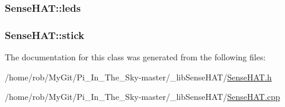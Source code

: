 \subsubsection[{\texorpdfstring{leds}{leds}}]{ Sense\+H\+A\+T\+::leds}\hypertarget{class_sense_h_a_t_a09557e42b20ddddc1763917bd36f36a7}{}\label{class_sense_h_a_t_a09557e42b20ddddc1763917bd36f36a7}
\subsubsection[{\texorpdfstring{stick}{stick}}]{ Sense\+H\+A\+T\+::stick}\hypertarget{class_sense_h_a_t_a69d5712bf0663364109f9a482178dc2c}{}\label{class_sense_h_a_t_a69d5712bf0663364109f9a482178dc2c}


The documentation for this class was generated from the following files\+:\begin{DoxyCompactItemize}
\item 
/home/rob/\+My\+Git/\+Pi\+\_\+\+In\+\_\+\+The\+\_\+\+Sky-\/master/\+\_\+lib\+Sense\+H\+A\+T/\hyperlink{_sense_h_a_t_8h}{Sense\+H\+A\+T.\+h}\item 
/home/rob/\+My\+Git/\+Pi\+\_\+\+In\+\_\+\+The\+\_\+\+Sky-\/master/\+\_\+lib\+Sense\+H\+A\+T/\hyperlink{_sense_h_a_t_8cpp}{Sense\+H\+A\+T.\+cpp}\end{DoxyCompactItemize}
